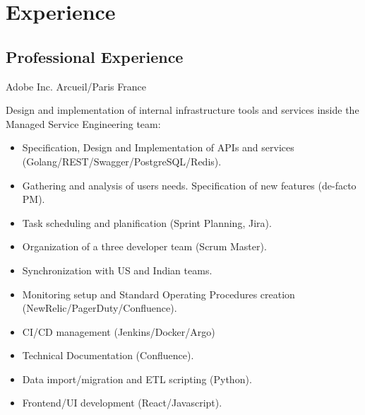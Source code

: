 \documentclass[10pt,a4paper,sans]{moderncv}        %
\begin{document}
\maketitle

\section{Experience}

\subsection{Professional Experience}
        {Adobe Inc.}
        {Arcueil/Paris}
        {France}
        {}

        {}
        {}
        {}
        {Design and implementation of internal infrastructure tools and services inside the Managed Service Engineering team:
        \begin{itemize}
            \item Specification, Design and Implementation of APIs and services (Golang/REST/Swagger/PostgreSQL/Redis).
            \item Gathering and analysis of users needs. Specification of new features (de-facto PM).
            \item Task scheduling and planification (Sprint Planning, Jira).
            \item Organization of a three developer team (Scrum Master).
            \item Synchronization with US and Indian teams.
            \item Monitoring setup and Standard Operating Procedures creation (NewRelic/PagerDuty/Confluence).
            \item CI/CD management (Jenkins/Docker/Argo)
            \item Technical Documentation (Confluence).
            \item Data import/migration and ETL scripting (Python).
            \item Frontend/UI development (React/Javascript).
        \end{itemize}
        }
\end{document}
